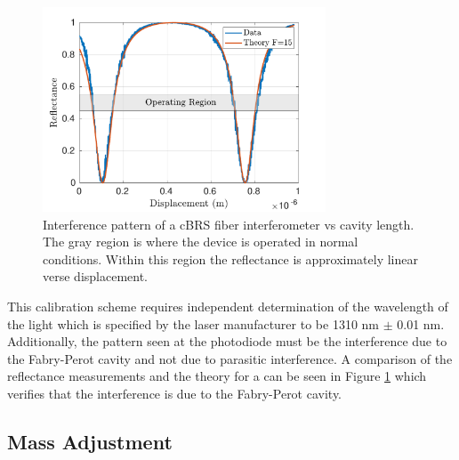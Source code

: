 \documentclass [12pt, proquest]{uwthesis}[2019]
\begin{document}
\begin{figure}[!h]
\begin{center}
 \includegraphics[width=0.75\textwidth]{cBRS_Fringes.pdf}
\caption[Interference pattern of a cBRS fiber interferometer vs cavity length]{Interference pattern of a cBRS fiber interferometer vs cavity length. The gray region is where the device is operated in normal conditions. Within this region the reflectance is approximately linear verse displacement.}
\label{cBRS_fringes}
\end{center}
\end{figure}

This calibration scheme requires independent determination of the wavelength of the light which is specified by the laser manufacturer to be 1310 nm $\pm$ 0.01 nm. Additionally, the pattern seen at the photodiode must be the interference due to the Fabry-Perot cavity and not due to parasitic interference. A comparison of the reflectance measurements and the theory for a can be seen in Figure \ref{cBRS_fringes} which verifies that the interference is due to the Fabry-Perot cavity.


\subsection{Mass Adjustment}
\end{document}
